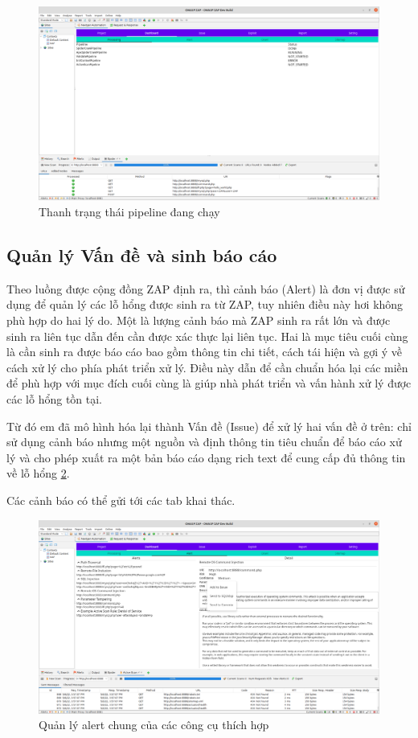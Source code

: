 \documentclass[./../main.tex]{subfiles}
\begin{document}
\begin{figure}[h!]
	\includegraphics[width=\linewidth]{./images/state.png}
	\caption{Thanh trạng thái pipeline đang chạy}
	\label{fig:state}
\end{figure}

\subsection{Quản lý Vấn đề và sinh báo cáo}
Theo luồng được cộng đồng ZAP định ra, thì cảnh báo (Alert) là đơn
vị được sử dụng để quản lý các lỗ hổng được sinh ra từ ZAP, tuy nhiên
điều này hơi không phù hợp do hai lý do. Một là lượng cảnh báo mà ZAP
sinh ra rất lớn và được sinh ra liên tục dẫn đến cần được xác thực lại
liên tục. Hai là mục tiêu cuối cùng là cần sinh ra được báo cáo bao gồm
thông tin chi tiết, cách tái hiện và gợi ý về cách xử lý cho phía
phát triển xử lý. Điều này dẫn để cần chuẩn hóa lại các miền để
phù hợp với mục đích cuối cùng là giúp nhà phát triển và vấn hành
xử lý được các lỗ hổng tồn tại.

Từ đó em đã mô hình hóa lại thành Vấn đề (Issue) để xử lý hai vấn đề ở trên:
chỉ sử dụng cảnh báo nhưng một nguồn và định thông tin tiêu chuẩn để
báo cáo xử lý và cho phép xuất ra một bản báo cáo dạng rich text để cung
cấp đủ thông tin về lỗ hổng \ref{fig:alert}.

Các cảnh báo có thể gửi tới các tab khai thác.

\begin{figure}[h!]
	\includegraphics[width=\linewidth]{./images/alert.png}
	\caption{Quản lý alert chung của các công cụ thích hợp}
	\label{fig:alert}
\end{figure}
\end{document}
